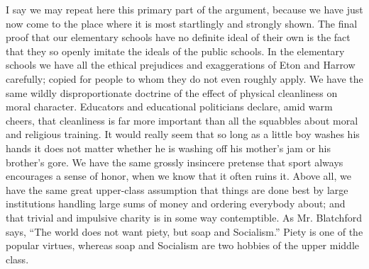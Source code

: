 \documentclass{book}
\begin{document}
I say we may repeat here this primary part of the argument, because we have just now come to the place where it is most startlingly and strongly shown. The final proof that our elementary schools have no definite ideal of their own is the fact that they so openly imitate the ideals of the public schools. In the elementary schools we have all the ethical prejudices and exaggerations of Eton and Harrow carefully; copied for people to whom they do not even roughly apply. We have the same wildly disproportionate doctrine of the effect of physical cleanliness on moral character. Educators and educational politicians declare, amid warm cheers, that cleanliness is far more important than all the squabbles about moral and religious training. It would really seem that so long as a little boy washes his hands it does not matter whether he is washing off his mother’s jam or his brother’s gore. We have the same grossly insincere pretense that sport always encourages a sense of honor, when we know that it often ruins it. Above all, we have the same great upper-class assumption that things are done best by large institutions handling large sums of money and ordering everybody about; and that trivial and impulsive charity is in some way contemptible. As Mr. Blatchford says, “The world does not want piety, but soap and Socialism.” Piety is one of the popular virtues, whereas soap and Socialism are two hobbies of the upper middle class.
\end{document}
